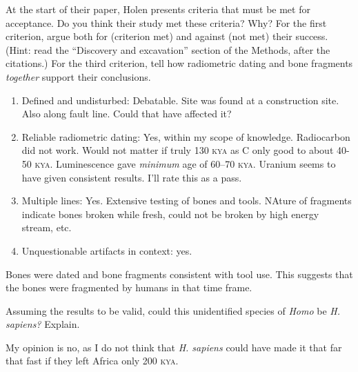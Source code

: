 \documentclass[11pt, hidelinks, addpoints]{exam}
\newcommand{\kya}{\textsc{kya}}
\begin{document}
\begin{questions}
\question[5] \label{ques:criteria}
At the start of their paper, Holen presents criteria that must be met for acceptance. Do you think their study met these criteria? Why? For the first criterion, argue both for (criterion met) and against (not met) their success. (Hint: read the “Discovery and excavation” section of the Methods, after the citations.) For the third criterion, tell how radiometric dating and bone fragments \textit{together} support their conclusions.

\begin{solution}
	
	\begin{enumerate}
		\item Defined and undisturbed: Debatable. Site was found at a construction site. Also along fault line. Could that have affected it?
		
		\item Reliable radiometric dating: Yes, within my scope of knowledge. Radiocarbon did not work. Would not matter if truly 130 \kya{} as C only good to about 40-50 \kya. Luminescence gave \emph{minimum} age of 60–70 \kya. Uranium seems to have given consistent results. I'll rate this as a pass.
		
		\item Multiple lines: Yes.  Extensive testing of bones and tools. NAture of fragments indicate bones broken while fresh, could not be broken by high energy stream, etc.  
		
		\item Unquestionable artifacts in context: yes.
	\end{enumerate}

	Bones were dated and bone fragments consistent with tool use. This suggests that the bones were fragmented by humans in that time frame.

\end{solution}


\question[5]
Assuming the results to be valid, could this unidentified species of \textit{Homo} be \textit{H. sapiens?} Explain.

\begin{solution}
My opinion is no, as I do not think that \textit{H. sapiens} could have made it that far that fast if they left Africa only 200 \kya.
\end{solution}


\end{questions}
\end{document}

